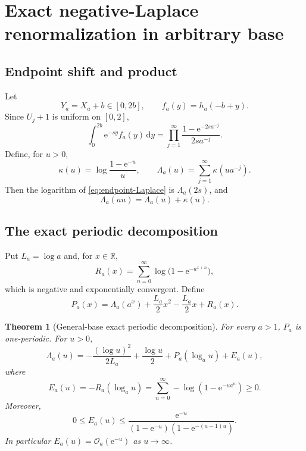 \documentclass[11pt,oneside]{article}
\newtheorem{theorem}{Theorem}[section]
\theoremstyle{definition}
\theoremstyle{remark}
\newcommand{\R}{\mathbb R}
\newcommand{\e}{\mathrm e}
\newcommand{\dd}{\,\mathrm d}
\newcommand{\bigO}{\mathcal O}
\begin{document}
\section{Exact negative-Laplace renormalization in arbitrary base}
\label{sec:laplace-general}

\subsection{Endpoint shift and product}

Let
\begin{equation}
 Y_a=X_a+b\in[0,2b],
 \qquad f_a(y)=h_a(-b+y).
 \label{eq:endpoint-shift}
\end{equation}
Since $U_j+1$ is uniform on $[0,2]$,
\begin{equation}
 \int_0^{2b}\e^{-sy}f_a(y)\dd y
 =\prod_{j=1}^{\infty}
 \frac{1-\e^{-2sa^{-j}}}{2sa^{-j}}.
 \label{eq:endpoint-Laplace}
\end{equation}
Define, for $u>0$,
\begin{equation}
 \kappa(u)=\log\frac{1-\e^{-u}}{u},
 \qquad
 \Lambda_a(u)=\sum_{j=1}^{\infty}\kappa(ua^{-j}).
 \label{eq:Lambda-a}
\end{equation}
Then the logarithm of \eqref{eq:endpoint-Laplace} is $\Lambda_a(2s)$, and
\begin{equation}
 \Lambda_a(au)=\Lambda_a(u)+\kappa(u).
 \label{eq:Lambda-dilation}
\end{equation}

\subsection{The exact periodic decomposition}

Put $L_a=\log a$ and, for $x\in\R$,
\begin{equation}
 R_a(x)=\sum_{n=0}^{\infty}\log\bigl(1-\e^{-a^{x+n}}\bigr),
 \label{eq:Rax}
\end{equation}
which is negative and exponentially convergent.  Define
\begin{equation}
 P_a(x)=\Lambda_a(a^x)+\frac{L_a}{2}x^2-\frac{L_a}{2}x+R_a(x).
 \label{eq:Pa-def}
\end{equation}

\begin{theorem}[General-base exact periodic decomposition]
\label{thm:general-periodic}
For every $a>1$, $P_a$ is one-periodic.  For $u>0$,
\begin{equation}
 \boxed{\quad
 \Lambda_a(u)=
 -\frac{(\log u)^2}{2L_a}+\frac{\log u}{2}
 +P_a(\log_a u)+E_a(u),
 \quad}
 \label{eq:general-exact-Laplace}
\end{equation}
where
\begin{equation}
 E_a(u)=-R_a(\log_a u)
 =\sum_{n=0}^{\infty}-\log(1-\e^{-ua^n})\ge0.
 \label{eq:Ea}
\end{equation}
Moreover,
\begin{equation}
 0\le E_a(u)\le
 \frac{\e^{-u}}{(1-\e^{-u})(1-\e^{-(a-1)u})}.
 \label{eq:Ea-bound}
\end{equation}
In particular $E_a(u)=\bigO_a(\e^{-u})$ as $u\to\infty$.
\end{theorem}
\end{document}
